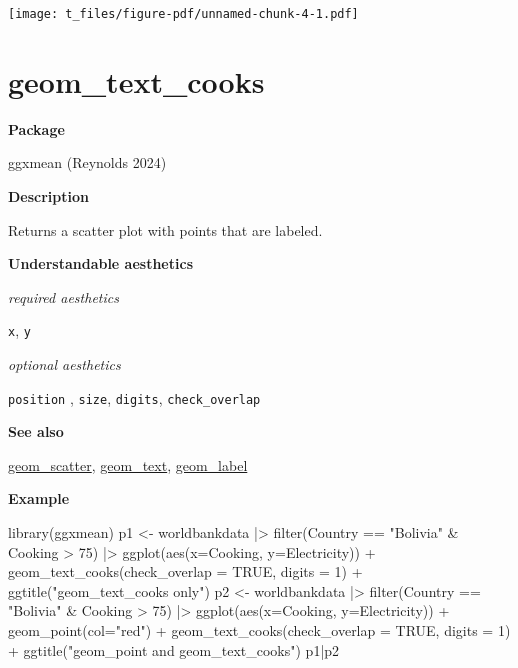 \documentclass[
  letterpaper,
  DIV=11,
  numbers=noendperiod]{scrreprt}
\newenvironment{Shaded}{\begin{snugshade}}{\end{snugshade}}
\newcommand{\AttributeTok}[1]{\textcolor[rgb]{0.40,0.45,0.13}{#1}}
\newcommand{\ConstantTok}[1]{\textcolor[rgb]{0.56,0.35,0.01}{#1}}
\newcommand{\DecValTok}[1]{\textcolor[rgb]{0.68,0.00,0.00}{#1}}
\newcommand{\FunctionTok}[1]{\textcolor[rgb]{0.28,0.35,0.67}{#1}}
\newcommand{\NormalTok}[1]{\textcolor[rgb]{0.00,0.23,0.31}{#1}}
\newcommand{\OtherTok}[1]{\textcolor[rgb]{0.00,0.23,0.31}{#1}}
\newcommand{\SpecialCharTok}[1]{\textcolor[rgb]{0.37,0.37,0.37}{#1}}
\newcommand{\StringTok}[1]{\textcolor[rgb]{0.13,0.47,0.30}{#1}}
\begin{document}
\texttt{[image: t\_files/figure-pdf/unnamed-chunk-4-1.pdf]}

\section{geom\_text\_cooks}\label{text_cooks}

\textbf{Package}

ggxmean (Reynolds 2024)

\textbf{Description}

Returns a scatter plot with points that are labeled.

\textbf{Understandable aesthetics}

\emph{required aesthetics}

\texttt{x}, \texttt{y}

\emph{optional aesthetics}

\texttt{position} , \texttt{size}, \texttt{digits},
\texttt{check\_overlap}

\textbf{See also}

\hyperref[scatter]{geom\_scatter}, \hyperref[text]{geom\_text},
\hyperref[label]{geom\_label}

\textbf{Example}

\begin{Shaded}
\begin{Highlighting}[]
\FunctionTok{library}\NormalTok{(ggxmean)}
\NormalTok{p1 }\OtherTok{\textless{}{-}}\NormalTok{ worldbankdata }\SpecialCharTok{|\textgreater{}}
  \FunctionTok{filter}\NormalTok{(Country }\SpecialCharTok{==} \StringTok{"Bolivia"} \SpecialCharTok{\&}\NormalTok{ Cooking }\SpecialCharTok{\textgreater{}} \DecValTok{75}\NormalTok{) }\SpecialCharTok{|\textgreater{}}
  \FunctionTok{ggplot}\NormalTok{(}\FunctionTok{aes}\NormalTok{(}\AttributeTok{x=}\NormalTok{Cooking, }\AttributeTok{y=}\NormalTok{Electricity)) }\SpecialCharTok{+} 
  \FunctionTok{geom\_text\_cooks}\NormalTok{(}\AttributeTok{check\_overlap =} \ConstantTok{TRUE}\NormalTok{, }\AttributeTok{digits =} \DecValTok{1}\NormalTok{) }\SpecialCharTok{+} \FunctionTok{ggtitle}\NormalTok{(}\StringTok{"geom\_text\_cooks only"}\NormalTok{)  }
\NormalTok{p2 }\OtherTok{\textless{}{-}}\NormalTok{ worldbankdata }\SpecialCharTok{|\textgreater{}}
  \FunctionTok{filter}\NormalTok{(Country }\SpecialCharTok{==} \StringTok{"Bolivia"} \SpecialCharTok{\&}\NormalTok{ Cooking }\SpecialCharTok{\textgreater{}} \DecValTok{75}\NormalTok{) }\SpecialCharTok{|\textgreater{}}
  \FunctionTok{ggplot}\NormalTok{(}\FunctionTok{aes}\NormalTok{(}\AttributeTok{x=}\NormalTok{Cooking, }\AttributeTok{y=}\NormalTok{Electricity)) }\SpecialCharTok{+} 
  \FunctionTok{geom\_point}\NormalTok{(}\AttributeTok{col=}\StringTok{"red"}\NormalTok{) }\SpecialCharTok{+}
  \FunctionTok{geom\_text\_cooks}\NormalTok{(}\AttributeTok{check\_overlap =} \ConstantTok{TRUE}\NormalTok{, }\AttributeTok{digits =} \DecValTok{1}\NormalTok{) }\SpecialCharTok{+} \FunctionTok{ggtitle}\NormalTok{(}\StringTok{"geom\_point and geom\_text\_cooks"}\NormalTok{) }
\NormalTok{p1}\SpecialCharTok{|}\NormalTok{p2}
\end{Highlighting}
\end{Shaded}
\end{document}
